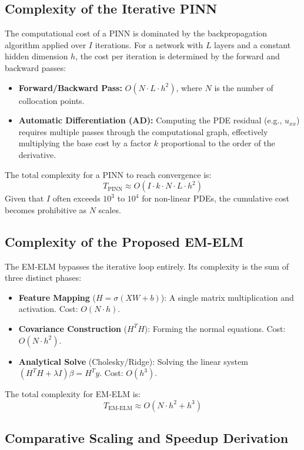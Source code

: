 \documentclass[final,12pt,3p,times,fleqn]{elsarticle}
\begin{document}
\subsection{Complexity of the Iterative PINN}

The computational cost of a PINN is dominated by the backpropagation algorithm applied over $I$ iterations. For a network with $L$ layers and a constant hidden dimension $h$, the cost per iteration is determined by the forward and backward passes:
\begin{itemize}
    \item \textbf{Forward/Backward Pass:} $O(N \cdot L \cdot h^2)$, where $N$ is the number of collocation points.
    \item \textbf{Automatic Differentiation (AD):} Computing the PDE residual (e.g., $u_{xx}$) requires multiple passes through the computational graph, effectively multiplying the base cost by a factor $k$ proportional to the order of the derivative.
\end{itemize}
The total complexity for a PINN to reach convergence is:
$$T_{\text{PINN}} \approx O(I \cdot k \cdot N \cdot L \cdot h^2)$$
Given that $I$ often exceeds $10^3$ to $10^4$ for non-linear PDEs, the cumulative cost becomes prohibitive as $N$ scales.

\subsection{Complexity of the Proposed EM-ELM}

The EM-ELM bypasses the iterative loop entirely. Its complexity is the sum of three distinct phases:
\begin{itemize}
    \item \textbf{Feature Mapping} ($H = \sigma(XW+b)$): A single matrix multiplication and activation. Cost: $O(N \cdot h)$.
    \item \textbf{Covariance Construction} ($H^T H$): Forming the normal equations. Cost: $O(N \cdot h^2)$.
    \item \textbf{Analytical Solve} (Cholesky/Ridge): Solving the linear system $(H^T H + \lambda I)\beta = H^T y$. Cost: $O(h^3)$.
\end{itemize}
The total complexity for EM-ELM is:
$$T_{\text{EM-ELM}} \approx O(N \cdot h^2 + h^3)$$

\subsection{Comparative Scaling and Speedup Derivation}
\end{document}
